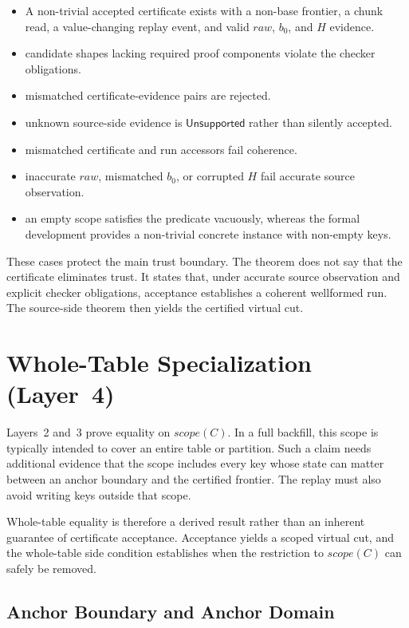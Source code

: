 \documentclass[letterpaper,10pt,twocolumn]{article}
\newcommand{\Scope}{\mathit{scope}}
\newcommand{\RawObs}{\mathit{raw}}
\newcommand{\Unsupported}{\mathsf{Unsupported}}
\providecommand{\tightlist}{\setlength{\itemsep}{0pt}\setlength{\parskip}{0pt}}
\begin{document}
\begin{itemize}\tightlist
\item A non-trivial accepted certificate exists with a
  non-base frontier, a chunk read, a value-changing replay event, and
  valid $\RawObs$, $b_0$, and $H$ evidence.
\item candidate shapes lacking required proof components violate the
  checker obligations.
\item mismatched certificate-evidence pairs are rejected.
\item unknown source-side evidence is $\Unsupported$ rather than
  silently accepted.
\item mismatched certificate and run accessors fail coherence.
\item inaccurate $\RawObs$, mismatched $b_0$, or corrupted $H$ fail
  accurate source observation.
\item an empty scope satisfies the predicate vacuously, whereas the formal
  development provides a non-trivial concrete instance with non-empty keys.
\end{itemize}

These cases protect the main trust boundary. The theorem does not say
that the certificate eliminates trust. It states that, under accurate
source observation and explicit checker obligations, acceptance establishes a
coherent wellformed run. The source-side theorem then
yields the certified virtual cut.

\section{Whole-Table Specialization \mbox{(Layer 4)}}\label{whole-table-specialization-layer-4}

Layers~2 and~3 prove equality on $\Scope(C)$. In a full backfill,
this scope is typically intended to cover an entire table or partition.
Such a claim needs additional evidence that the scope includes every
key whose state can matter between an anchor boundary and the certified
frontier. The replay must also avoid writing keys outside that scope.

Whole-table equality is therefore a derived result rather than an
inherent guarantee of certificate acceptance. Acceptance yields a
scoped virtual cut, and the whole-table side condition establishes when
the restriction to $\Scope(C)$ can safely be removed.

\subsection{Anchor Boundary and Anchor
Domain}\label{anchor-boundary-and-anchor-domain}
\end{document}
